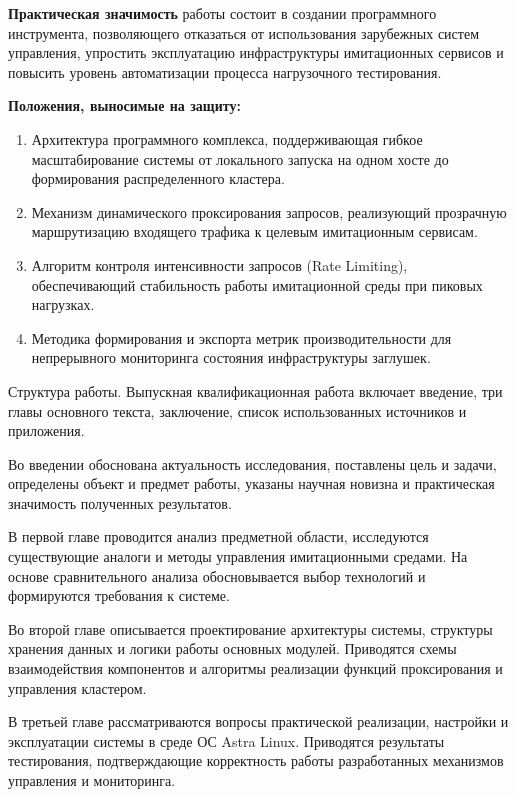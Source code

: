 \documentclass[
]{article}
\begin{document}
\textbf{Практическая значимость} работы состоит в создании программного
инструмента, позволяющего отказаться от использования зарубежных систем
управления, упростить эксплуатацию инфраструктуры имитационных сервисов
и повысить уровень автоматизации процесса нагрузочного тестирования.

\textbf{Положения, выносимые на защиту:}

\begin{enumerate}
\def\labelenumi{\arabic{enumi}.}
\item
  Архитектура программного комплекса, поддерживающая гибкое
  масштабирование системы от локального запуска на одном хосте до
  формирования распределенного кластера.
\item
  Механизм динамического проксирования запросов, реализующий прозрачную
  маршрутизацию входящего трафика к целевым имитационным сервисам.
\item
  Алгоритм контроля интенсивности запросов (Rate Limiting),
  обеспечивающий стабильность работы имитационной среды при пиковых
  нагрузках.
\item
  Методика формирования и экспорта метрик производительности для
  непрерывного мониторинга состояния инфраструктуры заглушек.
\end{enumerate}

Структура работы. Выпускная квалификационная работа включает введение,
три главы основного текста, заключение, список использованных источников
и приложения.

Во введении обоснована актуальность исследования, поставлены цель и
задачи, определены объект и предмет работы, указаны научная новизна и
практическая значимость полученных результатов.

В первой главе проводится анализ предметной области, исследуются
существующие аналоги и методы управления имитационными средами. На
основе сравнительного анализа обосновывается выбор технологий и
формируются требования к системе.

Во второй главе описывается проектирование архитектуры системы,
структуры хранения данных и логики работы основных модулей. Приводятся
схемы взаимодействия компонентов и алгоритмы реализации функций
проксирования и управления кластером.

В третьей главе рассматриваются вопросы практической реализации,
настройки и эксплуатации системы в среде ОС Astra Linux. Приводятся
результаты тестирования, подтверждающие корректность работы
разработанных механизмов управления и мониторинга.
\end{document}
